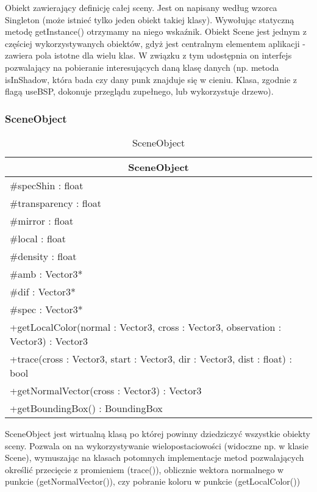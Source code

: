 Obiekt zawierający definicję całej sceny. Jest on napisany według wzorca Singleton (może istnieć tylko jeden obiekt takiej klasy). Wywołując statyczną metodę getInstance() otrzymamy na niego wskaźnik. Obiekt Scene jest jednym z częściej wykorzystywanych obiektów, gdyż jest centralnym elementem aplikacji - zawiera pola istotne dla wielu klas. W związku z tym udostępnia on interfejs pozwalający na pobieranie interesujących daną klasę danych (np. metoda isInShadow, która bada czy dany punk znajduje się w cieniu. Klasa, zgodnie z flagą useBSP, dokonuje przeglądu zupełnego, lub wykorzystuje drzewo).

\subsubsection{SceneObject}

\footnotesize
\begin{longtable}{|p{14cm}|}
    \caption{SceneObject} \label{tab:SceneObject} \\ \hline
    \multicolumn{1}{|c|}{SceneObject} \\ \hline
    \#specShin : float \\
    \#transparency : float \\
    \#mirror : float \\
    \#local : float \\
    \#density : float \\
    \#amb : Vector3* \\
    \#dif : Vector3* \\
    \#spec : Vector3* \\
    \hline
	+getLocalColor(normal : Vector3, cross : Vector3, observation : Vector3) : Vector3 \\
	+trace(cross : Vector3, start : Vector3, dir : Vector3, dist : float) : bool \\
	+getNormalVector(cross : Vector3) : Vector3 \\
	+getBoundingBox() : BoundingBox \\
	\hline
\end{longtable}
\normalsize

SceneObject jest wirtualną klasą po której powinny dziedziczyć wszystkie obiekty sceny. Pozwala on na wykorzystywanie wielopostaciowości (widoczne np. w klasie Scene), wymuszając na klasach potomnych implementacje metod pozwalających określić przecięcie z promieniem (trace()), oblicznie wektora normalnego w punkcie (getNormalVector()), czy pobranie koloru w punkcie (getLocalColor())

